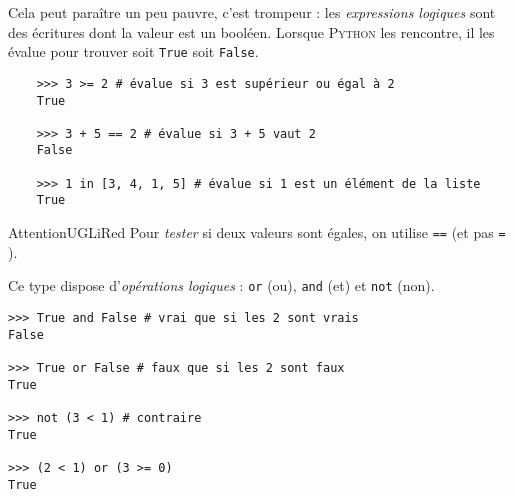 Cela peut paraître un peu pauvre, c'est trompeur : les \textit{expressions logiques} sont des écritures dont la valeur est un booléen. Lorsque \textsc{Python} les rencontre, il les évalue pour trouver soit \texttt{True} soit \texttt{False}.

\begin{pyc}
  \begin{verbatim}
    >>> 3 >= 2 # évalue si 3 est supérieur ou égal à 2
    True
    
    >>> 3 + 5 == 2 # évalue si 3 + 5 vaut 2
    False

    >>> 1 in [3, 4, 1, 5] # évalue si 1 est un élément de la liste
    True
  \end{verbatim}
\end{pyc}

\begin{encadrecolore}{Attention}{UGLiRed}
  Pour \textit{tester} si deux valeurs sont égales, on utilise \texttt{==}  (et pas \texttt{=} ).

\end{encadrecolore}


Ce type dispose d'\textit{opérations logiques} : \texttt{or} (ou), \texttt{and} (et) et \texttt{not} (non).

\begin{pyc}\begin{verbatim}
>>> True and False # vrai que si les 2 sont vrais
False

>>> True or False # faux que si les 2 sont faux
True

>>> not (3 < 1) # contraire
True

>>> (2 < 1) or (3 >= 0)
True
\end{verbatim}
\end{pyc}